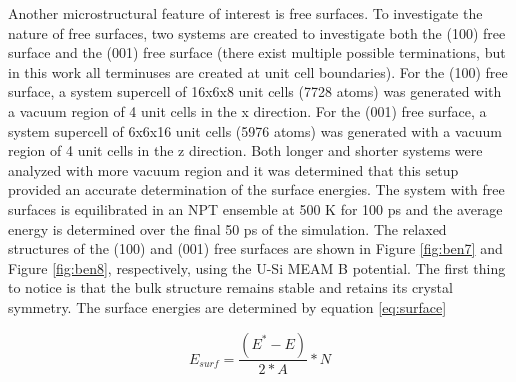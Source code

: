 \documentclass[review]{elsarticle}
\begin{document}

\FloatBarrier

Another microstructural feature of interest is free surfaces.  To investigate the nature of free surfaces, two systems are created to investigate both the (100) free surface and the (001) free surface (there exist multiple possible terminations, but in this work all terminuses are created at unit cell boundaries).  For the (100) free surface, a system supercell of 16x6x8 unit cells (7728 atoms) was generated with a vacuum region of 4 unit cells in the x direction.  For the (001) free surface, a system supercell of 6x6x16 unit cells (5976 atoms) was generated with a vacuum region of 4 unit cells in the z direction.  Both longer and shorter systems were analyzed with more vacuum region and it was determined that this setup provided an accurate determination of the surface energies.  The system with free surfaces is equilibrated in an NPT ensemble at 500 K for 100 ps and the average energy is determined over the final 50 ps of the simulation.  The relaxed structures of the (100) and (001) free surfaces are shown in Figure \ref{fig:ben7} and Figure \ref{fig:ben8}, respectively, using the U-Si MEAM B potential.  The first thing to notice is that the bulk structure remains stable and retains its crystal symmetry.  The surface energies are determined by equation \ref{eq:surface}

\begin{equation}
\label{eq:surface}
E_{surf}= \frac{(E^{*} - E)}{2*A} * N
\end{equation}
\end{document}
